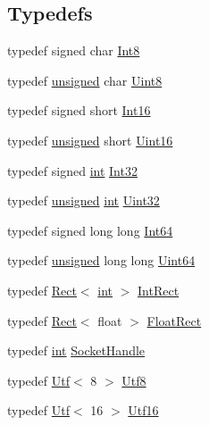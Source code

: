 \subsection*{Typedefs}
\begin{DoxyCompactItemize}
\item 
typedef signed char \hyperlink{namespacesf_a69b109973eac74e22b97e5339bdb68dd}{Int8}
\item 
typedef \hyperlink{curses_8priv_8h_aca40206900cfc164654362fa8d4ad1e6}{unsigned} char \hyperlink{namespacesf_a4ef3d630785c4f296f9b4f274c33d78e}{Uint8}
\item 
typedef signed short \hyperlink{namespacesf_a3c8e10435e2a310a7741755e66b5c94e}{Int16}
\item 
typedef \hyperlink{curses_8priv_8h_aca40206900cfc164654362fa8d4ad1e6}{unsigned} short \hyperlink{namespacesf_a2fcaf787248b0b83dfb6b145ca348246}{Uint16}
\item 
typedef signed \hyperlink{term__entry_8h_ad65b480f8c8270356b45a9890f6499ae}{int} \hyperlink{namespacesf_ac2dfd4952377a26dee4750e2e4a30a15}{Int32}
\item 
typedef \hyperlink{curses_8priv_8h_aca40206900cfc164654362fa8d4ad1e6}{unsigned} \hyperlink{term__entry_8h_ad65b480f8c8270356b45a9890f6499ae}{int} \hyperlink{namespacesf_aa746fb1ddef4410bddf198ebb27e727c}{Uint32}
\item 
typedef signed long long \hyperlink{namespacesf_a2840579fed3494d9f330baf7a5a19903}{Int64}
\item 
typedef \hyperlink{curses_8priv_8h_aca40206900cfc164654362fa8d4ad1e6}{unsigned} long long \hyperlink{namespacesf_add9ac83466d96b9f50a009b9f4064266}{Uint64}
\item 
typedef \hyperlink{classsf_1_1_rect}{Rect}$<$ \hyperlink{term__entry_8h_ad65b480f8c8270356b45a9890f6499ae}{int} $>$ \hyperlink{namespacesf_a1b1279ab06950b96686cffaacb72fed5}{Int\-Rect}
\item 
typedef \hyperlink{classsf_1_1_rect}{Rect}$<$ float $>$ \hyperlink{namespacesf_ab0d978f5903922a6bdfca1736b71ccc9}{Float\-Rect}
\item 
typedef \hyperlink{term__entry_8h_ad65b480f8c8270356b45a9890f6499ae}{int} \hyperlink{namespacesf_aefabb521d8f5eec9e6a9b521271d20d1}{Socket\-Handle}
\item 
typedef \hyperlink{classsf_1_1_utf}{Utf}$<$ 8 $>$ \hyperlink{namespacesf_a8626e71b97fd5e81b6c02cdfe775780f}{Utf8}
\item 
typedef \hyperlink{classsf_1_1_utf}{Utf}$<$ 16 $>$ \hyperlink{namespacesf_a0868ce4b7cda7b545427fe9044e456e2}{Utf16}

\end{DoxyCompactItemize}
